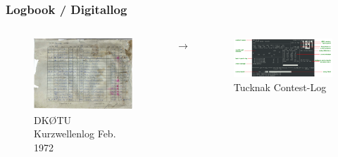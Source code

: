 \begin{frame}
  \frametitle{Logbook / Digitallog}

  \begin{columns}
    \begin{center}
      \begin{figure}
        \includegraphics[height=0.25\textheight,width=\textwidth,keepaspectratio]{bv13/DK0TU_LOG_KW_1972-02_Auszug.jpg}
        \caption{DKØTU Kurzwellenlog Feb. 1972}
      \end{figure}
    \end{center}
    \hspace{2pc}$\rightarrow$\hspace{1pc}
    \begin{center}
      \begin{figure}
        \includegraphics[height=0.25\textheight,width=\textwidth,keepaspectratio]{bv13/tucnak_Hf-10.png}
        \caption{Tucknak Contest-Log}
      \end{figure}
    \end{center}
  \end{columns}


\end{frame}
